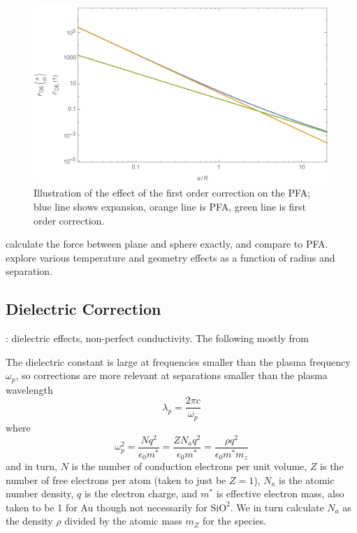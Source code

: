 \documentclass[11pt]{article}
\begin{document}
\begin{figure}[h]
\centering
\includegraphics[width=5in]{PFAExpansion}
\caption{Illustration of the effect of the first order correction on the PFA; blue line shows expansion, orange line is PFA, green line is first order correction.}\label{fig:expansion}
\end{figure}

\citet{Bulgac} calculate the force between plane and sphere exactly, and compare to PFA. \citet{Durand} explore various temperature and geometry effects as a function of radius and separation. 

\subsection{Dielectric Correction}
\citet{BeyondPFA,Lambrecht}: dielectric effects, non-perfect conductivity. The following mostly from \citet{Lambrecht}

The dielectric constant is large at frequencies smaller than the plasma frequency $\omega_p$, so corrections are more relevant at separations smaller than the plasma wavelength
$$
\lambda_p=\frac{2\pi c}{\omega_p}
$$
where
$$
\omega_p^2=\frac{Nq^2}{\epsilon_0m^*}=\frac{ZN_aq^2}{\epsilon_0m^*}=\frac{\rho q^2}{\epsilon_0m^*m_z}
$$
and in turn, $N$ is the number of conduction electrons per unit volume, $Z$ is the number of free electrons per atom (taken to just be $Z=1$), $N_a$ is the atomic number density, $q$ is the electron charge, and $m^*$ is effective electron mass, also taken to be 1 for Au though not necessarily for $\mathrm{SiO^2}$. We in turn calculate $N_a$ as the density $\rho$ divided by the atomic mass $m_Z$ for the species.
\end{document}
